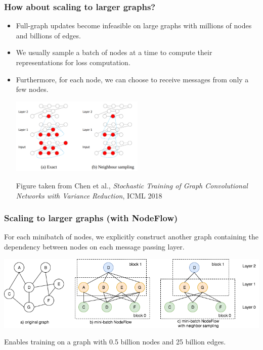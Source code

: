 \documentclass[10pt,aspectratio=169]{beamer}
\begin{document}
	\begin{frame}
		\frametitle{How about scaling to larger graphs?}
		\begin{itemize}
			\item Full-graph updates become infeasible on large graphs with millions of nodes and billions of edges.
			\item We usually sample a batch of nodes at a time to compute their representations for loss computation.
			\item Furthermore, for each node, we can choose to receive messages from only a few nodes.
			\begin{center}
				\centering
				\includegraphics[width=0.5\textwidth]{nodeflow.png}
				
				\small Figure taken from Chen et al., \emph{Stochastic Training of Graph Convolutional Networks with Variance Reduction}, ICML 2018
			\end{center}
		\end{itemize}
	\end{frame}

	\begin{frame}
		\frametitle{Scaling to larger graphs (with NodeFlow)}
		For each minibatch of nodes, we explicitly construct another graph containing the dependency between nodes on each message passing layer.
		\begin{center}
			\centering
			\includegraphics[width=\textwidth]{nodeflow2.png}
		\end{center}
		Enables training on a graph with 0.5 billion nodes and 25 billion edges.
	\end{frame}
\end{document}
